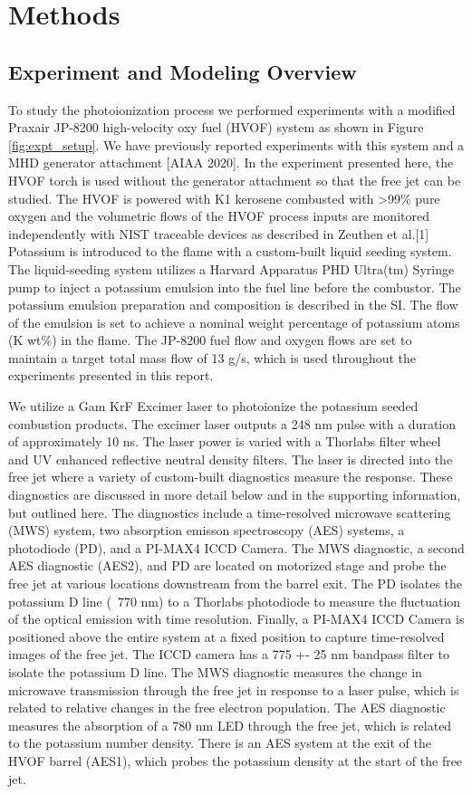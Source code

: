 \section{Methods}


\subsection{Experiment and Modeling Overview}

To study the photoionization process we performed experiments with a modified Praxair JP-8200 high-velocity oxy fuel (HVOF) system as shown in Figure \ref{fig:expt_setup}. We have previously reported experiments with this system and a MHD generator attachment [AIAA 2020]. In the experiment presented here, the HVOF torch is used without the generator attachment so that the free jet can be studied.  The HVOF is powered with K1 kerosene combusted with >99\% pure oxygen and the volumetric flows of the HVOF process inputs are monitored independently with NIST traceable devices as described in Zeuthen et al.[1] Potassium is introduced to the flame with a custom-built liquid seeding system. The liquid-seeding system utilizes a Harvard Apparatus PHD Ultra(tm) Syringe pump to inject a potassium emulsion into the fuel line before the combustor. The potassium emulsion preparation and composition is described in the SI. The flow of the emulsion is set to achieve a nominal weight percentage of potassium atoms (K wt\%) in the flame. The JP-8200 fuel flow and oxygen flows are set to maintain a target total mass flow of 13 g/s, which is used throughout the experiments presented in this report.

We utilize a Gam KrF Excimer laser to photoionize the potassium seeded combustion products. The excimer laser outputs a 248 nm pulse with a duration of approximately 10 ns. The laser power is varied with a Thorlabs filter wheel and UV enhanced reflective neutral density filters. The laser is directed into the free jet where a variety of custom-built diagnostics measure the response. These diagnostics are discussed in more detail below and in the supporting information, but outlined here. The diagnostics include a time-resolved microwave scattering (MWS) system, two absorption emisson spectroscopy (AES) systems, a photodiode (PD), and a PI-MAX4 ICCD Camera.  The MWS diagnostic, a second AES diagnostic (AES2), and PD are located on motorized stage and probe the free jet at various locations downstream from the barrel exit. The PD isolates the potassium D line (~770 nm) to a Thorlabs photodiode to measure the fluctuation of the optical emission with time resolution. Finally, a PI-MAX4 ICCD Camera is positioned above the entire system at a fixed position to capture time-resolved images of the free jet. The ICCD camera has a 775 +- 25 nm bandpass filter to isolate the potassium D line. The MWS diagnostic measures the change in microwave transmission through the free jet in response to a laser pulse, which is related to relative changes in the free electron population. The AES diagnostic measures the absorption of a 780 nm LED through the free jet, which is related to the potassium number density. There is an AES system at the exit of the HVOF barrel (AES1), which probes the potassium density at the start of the free jet.

